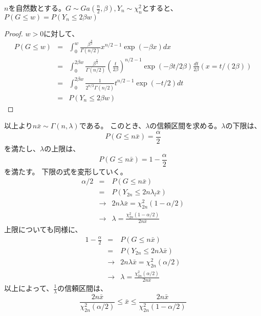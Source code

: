 \begin{theo}
$n$を自然数とする。$G\sim Ga(\frac{n}{2},\beta),Y_n\sim \chi^2_n$とすると、$P(G\leq w) = P(Y_n \leq 2\beta w)$
\end{theo}
\begin{proof}
$w >0$に対して、
\begin{eqnarray*}
    P(G \leq w) &=& \int_0^w \frac{\beta^\frac{n}{2}}{\Gamma(n/2)}x^{n/2-1}\exp{(-\beta x)}dx \\
    &=&\int_0^{2\beta w} \frac{\beta^{\frac{n}{2}}}{\Gamma(n/2)}\left( \frac{t}{2\beta} \right)^{n/2-1}\exp{(-\beta t/2\beta)}\frac{dt}{2\beta} (x=t/(2\beta)) \\
    &=& \int_0^{2\beta w} \frac{1}{2^{n/2}\Gamma(n/2)}t^{n/2-1}\exp{(-t/2)}dt\\
    &=&P(Y_n \leq 2\beta w)
\end{eqnarray*}
\end{proof}

以上より$n\bar{x}\sim \Gamma(n,\lambda)$である。
このとき、$\lambda$の信頼区間を求める。$\lambda$の下限は、
\begin{equation}
    P(G\leq n\bar{x}) = \frac{\alpha}{2}
\end{equation}
を満たし、$\lambda$の上限は、
\begin{equation}
P(G\leq n\bar{x}) = 1-\frac{\alpha}{2}
\end{equation}
を満たす。
下限の式を変形していく。
\begin{eqnarray*}
    \alpha/2 &=& P(G\leq n\bar{x})  \\
    &=& P(Y_{2n}\leq 2n \lambda_l \bar{x})\\
    &\rightarrow& 2n\lambda \bar{x} = \chi^2_{2n}(1-\alpha/2)\\
    &\rightarrow& \lambda = \frac{\chi^2_{2n}(1-\alpha/2)}{2n\bar{x}}
\end{eqnarray*}
上限についても同様に、
\begin{eqnarray*}
    1-\frac{\alpha}{2} &= & P(G\leq n\bar{x}) \\
    &=& P(Y_{2n}\leq 2n\lambda \bar{x})  \\
    &\rightarrow& 2n\lambda \bar{x} = \chi^2_{2n}(\alpha/2)\\
    &\rightarrow&  \lambda = \frac{\chi^2_{2n}(\alpha/2)}{2n\bar{x}}
\end{eqnarray*}
以上によって、$\frac{1}{\lambda}$の信頼区間は、
\begin{equation}
    \label{exp_model_confidence_interval}
    \frac{2n\bar{x}}{\chi^2_{2n}(\alpha/2)} \leq \bar{x} \leq \frac{2n\bar{x}}{\chi^2_{2n}(1-\alpha/2)}
\end{equation}




